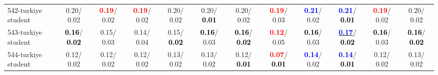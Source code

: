 \begin{table}[h]
\begin{center}
{\begin{tabular}{lc|c|c|c|c|c|c|c|c|c|c}
542-turkiye student &   0.20/  0.02 & \textcolor{red}{\textbf{  0.19}}/  0.02 & \textcolor{red}{\textbf{  0.19}}/  0.02 &   0.20/  0.02 &   0.20/\textcolor{black}{\textbf{  0.01}} &   0.20/  0.02 & \textcolor{red}{\textbf{  0.19}}/  0.03 & \textcolor{blue}{\textbf{  0.21}}/  0.02 & \textcolor{blue}{\textbf{  0.21}}/\textcolor{black}{\textbf{  0.01}} & \textcolor{red}{\textbf{  0.19}}/  0.02 &   0.20/  0.02 \\
543-turkiye student & \textcolor{black}{\textbf{  0.16}}/\textcolor{black}{\textbf{  0.02}} &   0.15/  0.03 &   0.14/  0.04 &   0.15/\textcolor{black}{\textbf{  0.02}} & \textcolor{black}{\textbf{  0.16}}/  0.03 & \textcolor{black}{\textbf{  0.16}}/\textcolor{black}{\textbf{  0.02}} & \textcolor{red}{\textbf{  0.12}}/  0.05 & \textcolor{black}{\textbf{  0.16}}/  0.03 & \underline{\textcolor{blue}{\textbf{  0.17}}}/\textcolor{black}{\textbf{  0.02}} & \textcolor{black}{\textbf{  0.16}}/  0.03 & \textcolor{black}{\textbf{  0.16}}/\textcolor{black}{\textbf{  0.02}} \\
544-turkiye student &   0.12/  0.02 &   0.12/  0.02 &   0.12/  0.02 &   0.13/  0.02 &   0.13/  0.02 &   0.12/\textcolor{black}{\textbf{  0.01}} & \textcolor{red}{\textbf{  0.07}}/\textcolor{black}{\textbf{  0.01}} & \textcolor{blue}{\textbf{  0.14}}/  0.02 & \textcolor{blue}{\textbf{  0.14}}/\textcolor{black}{\textbf{  0.01}} &   0.12/  0.02 &   0.13/  0.02 \\\end{tabular}}\label{stratsALCKappa16AllReduxa}
\end{center}
\end{table}
